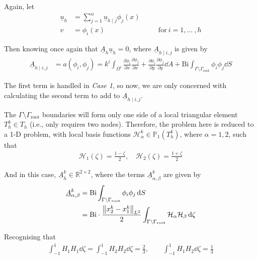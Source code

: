 \begin{enumerate}[label=(\alph*),leftmargin=*,itemsep=0mm]
\begin{itemize}
        Again, let
        \begin{align*}
            \underline{u}_h &= \sum_{j=1}^n \underline{u}_{h\mid j} \phi_j(x) \\
            v &= \phi_i(x) && \quad \text{for}\> i=1, ...\>, h
        \end{align*}
        
        Then knowing once again that $\underline{A}_h\underline{u}_h = 0$, where $\underline{A}_{h\mid i,j}$ is given by
        \begin{align}
            \underline{A}_{h\mid i,j} &= a(\phi_i,\phi_j)
            = k^i \int_{\Omega^i} \frac{\partial{\phi_i}}{\partial{x}} \frac{\partial{\phi_j}}{\partial{x}}
            + \frac{\partial{\phi_i}}{\partial{y}} \frac{\partial{\phi_j}}{\partial{y}} \dd{A}
            + \text{Bi} \int_{\Gamma\setminus\Gamma_\text{root}} \phi_i\phi_j \dd{S}
        \end{align}
        
        The first term is handled in \textit{Case 1}, so now, we are only concerned with calculating the second term to add to $\underline{A}_{h\mid i,j}$.
        
        The $\Gamma\setminus\Gamma_\text{root}$ boundaries will form only one side of a local triangular element $T_h^k \in T_h$ (i.e., only requires two nodes).  Therefore, the problem here is reduced to a 1-D problem, with local basis functions $\mathcal{H}_\alpha^k \in \mathbb{P}_1(T_h^k)$, where $\alpha = 1,2$, such that
        \begin{align*}
            \mathcal{H}_1(\zeta) = \frac{1-\zeta}{2},\quad
            \mathcal{H}_2(\zeta) = \frac{1+\zeta}{2}
        \end{align*}
        
        And in this case, $\underline{A}_h^k\in\mathbb{R}^{2\times2}$, where the terms $\underline{A}_{\alpha,\beta}^k$ are given by
        \begin{align*}
            \underline{A}_{\alpha,\beta}^k &= \text{Bi}
            \int_{\Gamma\setminus\Gamma_\text{root}} \phi_i\phi_j \dd{S} \\
            &= \text{Bi} \cdot \frac{\norm{x_2^k-x_1^k}_{L^2}}{2}
            \int_{\Gamma\setminus\Gamma_\text{root}} \mathcal{H}_\alpha\mathcal{H}_\beta \dd{\zeta}
        \end{align*}
        
        Recognising that
        \begin{align*}
            \int_{-1}^1 H_1H_1 \dd{\zeta} = \int_{-1}^1 H_2H_2 \dd{\zeta} = \frac{2}{3}, \qquad
            \int_{-1}^1 H_1H_2 \dd{\zeta} = \frac{1}{3}
        \end{align*}
        

\end{itemize}
\end{enumerate}
